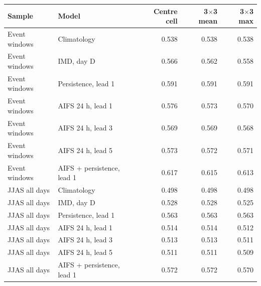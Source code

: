 \begin{tabular}{llrrr}\toprule Sample & Model & Centre cell & 3$\times$3 mean & 3$\times$3 max \\ \midrule
Event windows & Climatology & 0.538 & 0.538 & 0.538 \\
Event windows & IMD, day D & 0.566 & 0.562 & 0.558 \\
Event windows & Persistence, lead 1 & 0.591 & 0.591 & 0.591 \\
Event windows & AIFS 24 h, lead 1 & 0.576 & 0.573 & 0.570 \\
Event windows & AIFS 24 h, lead 3 & 0.569 & 0.569 & 0.568 \\
Event windows & AIFS 24 h, lead 5 & 0.573 & 0.572 & 0.571 \\
Event windows & AIFS + persistence, lead 1 & 0.617 & 0.615 & 0.613 \\
\midrule
JJAS all days & Climatology & 0.498 & 0.498 & 0.498 \\
JJAS all days & IMD, day D & 0.528 & 0.528 & 0.525 \\
JJAS all days & Persistence, lead 1 & 0.563 & 0.563 & 0.563 \\
JJAS all days & AIFS 24 h, lead 1 & 0.514 & 0.514 & 0.512 \\
JJAS all days & AIFS 24 h, lead 3 & 0.513 & 0.513 & 0.511 \\
JJAS all days & AIFS 24 h, lead 5 & 0.511 & 0.511 & 0.509 \\
JJAS all days & AIFS + persistence, lead 1 & 0.572 & 0.572 & 0.570 \\
\bottomrule\end{tabular}